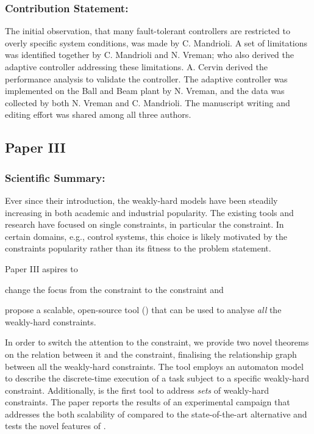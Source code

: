 \subsubsection*{Contribution Statement:}%
%
The initial observation, that many fault-tolerant controllers are restricted to overly specific system conditions, was made by C. Mandrioli.
A set of limitations was identified together by C. Mandrioli and N. Vreman; who also derived the adaptive controller addressing these limitations.
A. Cervin derived the performance analysis to validate the controller.
The adaptive controller was implemented on the Ball and Beam plant by N. Vreman, and the data was collected by both N. Vreman and C. Mandrioli.
The manuscript writing and editing effort was shared among all three authors.


\subsection*{Paper III}%
%
\begin{quote}
\end{quote}

\subsubsection*{Scientific Summary:}%
%
Ever since their introduction, the weakly-hard models have been steadily increasing in both academic and industrial popularity.
The existing tools and research have focused on single constraints, in particular the \tAM{} constraint.
In certain domains, e.g., control systems, this choice is likely motivated by the \tAM{} constraints popularity rather than its fitness to the problem statement.

Paper III aspires to
\begin{enumerate*}[label=(\roman*)]
    \item change the focus from the \tAM{} constraint to the \tRH{} constraint and
    \item propose a scalable, open-source tool (\tool{}) that can be used to analyse \emph{all} the weakly-hard constraints.
\end{enumerate*}
In order to switch the attention to the \tRH{} constraint, we provide two novel theorems on the relation between it and the \tAH{} constraint, finalising the relationship graph between all the weakly-hard constraints.
The \tool{} tool employs an automaton model to describe the discrete-time execution of a task subject to a specific weakly-hard constraint.
Additionally, \tool{} is the first tool to address \emph{sets} of weakly-hard constraints.
The paper reports the results of an experimental campaign that addresses the both scalability of \tool{} compared to the state-of-the-art alternative and tests the novel features of \tool{}.

